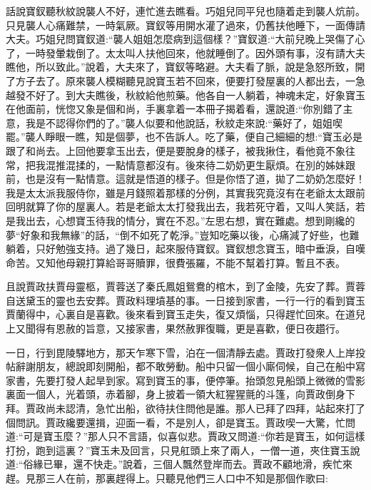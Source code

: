 


\begin{parag}
    話說寶釵聽秋紋說襲人不好，連忙進去瞧看。巧姐兒同平兒也隨着走到襲人炕前。只見襲人心痛難禁，一時氣厥。寶釵等用開水灌了過來，仍舊扶他睡下，一面傳請大夫。巧姐兒問寶釵道:“襲人姐姐怎麼病到這個樣？”寶釵道:“大前兒晚上哭傷了心了，一時發暈栽倒了。太太叫人扶他回來，他就睡倒了。因外頭有事，沒有請大夫瞧他，所以致此。”說着，大夫來了，寶釵等略避。大夫看了脈，說是急怒所致，開了方子去了。原來襲人模糊聽見說寶玉若不回來，便要打發屋裏的人都出去，一急越發不好了。到大夫瞧後，秋紋給他煎藥。他各自一人躺着，神魂未定，好象寶玉在他面前，恍惚又象是個和尚，手裏拿着一本冊子揭着看，還說道:“你別錯了主意，我是不認得你們的了。”襲人似要和他說話，秋紋走來說:“藥好了，姐姐喫罷。”襲人睜眼一瞧，知是個夢，也不告訴人。吃了藥，便自己細細的想:“寶玉必是跟了和尚去。上回他要拿玉出去，便是要脫身的樣子，被我揪住，看他竟不象往常，把我混推混揉的，一點情意都沒有。後來待二奶奶更生厭煩。在別的姊妹跟前，也是沒有一點情意。這就是悟道的樣子。但是你悟了道，拋了二奶奶怎麼好！我是太太派我服侍你，雖是月錢照着那樣的分例，其實我究竟沒有在老爺太太跟前回明就算了你的屋裏人。若是老爺太太打發我出去，我若死守着，又叫人笑話，若是我出去，心想寶玉待我的情分，實在不忍。”左思右想，實在難處。想到剛纔的夢“好象和我無緣”的話，“倒不如死了乾淨。”豈知吃藥以後，心痛減了好些，也難躺着，只好勉強支持。過了幾日，起來服侍寶釵。寶釵想念寶玉，暗中垂淚，自嘆命苦。又知他母親打算給哥哥贖罪，很費張羅，不能不幫着打算。暫且不表。
\end{parag}


\begin{parag}
    且說賈政扶賈母靈柩，賈蓉送了秦氏鳳姐鴛鴦的棺木，到了金陵，先安了葬。賈蓉自送黛玉的靈也去安葬。賈政料理墳基的事。一日接到家書，一行一行的看到寶玉賈蘭得中，心裏自是喜歡。後來看到寶玉走失，復又煩惱，只得趕忙回來。在道兒上又聞得有恩赦的旨意，又接家書，果然赦罪復職，更是喜歡，便日夜趲行。
\end{parag}


\begin{parag}
    一日，行到毘陵驛地方，那天乍寒下雪，泊在一個清靜去處。賈政打發衆人上岸投帖辭謝朋友，總說即刻開船，都不敢勞動。船中只留一個小廝伺候，自己在船中寫家書，先要打發人起旱到家。寫到寶玉的事，便停筆。抬頭忽見船頭上微微的雪影裏面一個人，光着頭，赤着腳，身上披着一領大紅猩猩氈的斗篷，向賈政倒身下拜。賈政尚未認清，急忙出船，欲待扶住問他是誰。那人已拜了四拜，站起來打了個問訊。賈政纔要還揖，迎面一看，不是別人，卻是寶玉。賈政喫一大驚，忙問道:“可是寶玉麼？”那人只不言語，似喜似悲。賈政又問道:“你若是寶玉，如何這樣打扮，跑到這裏？”寶玉未及回言，只見舡頭上來了兩人，一僧一道，夾住寶玉說道:“俗緣已畢，還不快走。”說着，三個人飄然登岸而去。賈政不顧地滑，疾忙來趕。見那三人在前，那裏趕得上。只聽見他們三人口中不知是那個作歌曰:
\end{parag}


